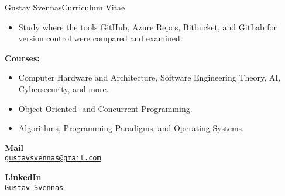 \documentclass{article}
\begin{document}
\begin{cv}{Gustav Svennas}{Curriculum Vitae}

\begin{cvevent}[2023-04][2023-06]
    \begin{itemize}
        \item Study where the tools GitHub, Azure Repos, Bitbucket, and GitLab for version control were compared and examined.
    \end{itemize}
\end{cvevent}

\begin{cvevent}[2018-09][2023-09]
    \textbf{Courses:}
    \begin{itemize}
        \item Computer Hardware and Architecture, Software Engineering Theory, AI, Cybersecurity, and more.
        \item Object Oriented- and Concurrent Programming. 
        \item Algorithms, Programming Paradigms, and Operating Systems.
    \end{itemize}
\end{cvevent}


\begin{cvevent}[2017-06][2020-06]
\end{cvevent}


\cvsidebar %



\begin{cvitem}[Envelope][4]
    \textbf{Mail}\\
    \href{mailto:gustavsvennas@gmail.com}{\texttt{gustavsvennas@gmail.com}}
\end{cvitem}

\cvseparator[3]
\begin{cvitem}[Globe][4]
    \textbf{LinkedIn}\\
    \href{https://www.linkedin.com/in/gustav-svennas-18b575159}{\texttt{Gustav Svennas}}
\end{cvitem}


\end{cv}
\end{document}
